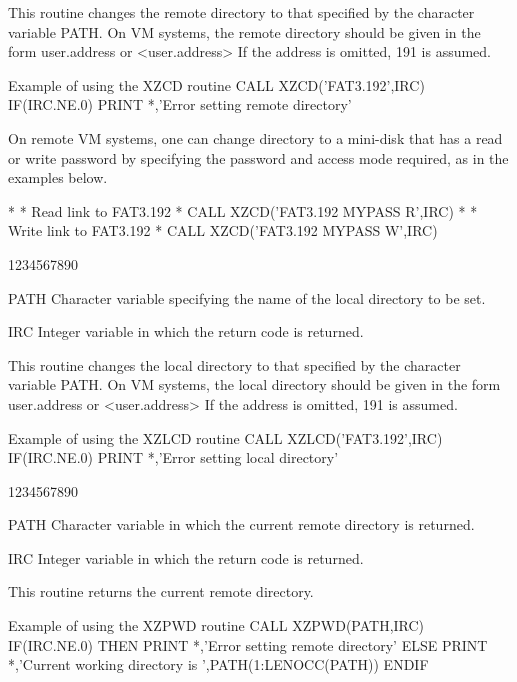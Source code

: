 \par
This routine changes the remote directory to that specified by
the character variable PATH. On VM systems, the remote directory
should be given in the form user.address or <user.address>
If the address is omitted, 191 is assumed.
\begin{XMPt}{Example of using the XZCD routine}
      CALL XZCD('FAT3.192',IRC)
      IF(IRC.NE.0) PRINT *,'Error setting remote directory'
\end{XMPt}
On remote VM systems, one can change directory to a mini-disk that
has a read or write password by specifying the password and access
mode required, as in the examples below.
\begin{XMP}
*
*     Read link to FAT3.192
*
      CALL XZCD('FAT3.192 MYPASS R',IRC)
*
*     Write link to FAT3.192
*
      CALL XZCD('FAT3.192 MYPASS W',IRC)
\end{XMP}
\begin{DLtt}{1234567890}
\item[PATH]Character variable specifying the name of the local directory
to be set.
\item[IRC]Integer variable in which the return code is returned.
\end{DLtt}
\par
This routine changes the local directory to that specified by
the character variable PATH. On VM systems, the local directory
should be given in the form user.address or <user.address>
If the address is omitted, 191 is assumed.
\begin{XMPt}{Example of using the XZLCD routine}
      CALL XZLCD('FAT3.192',IRC)
      IF(IRC.NE.0) PRINT *,'Error setting local directory'
\end{XMPt}
\begin{DLtt}{1234567890}
\item[PATH]Character variable in which the current remote directory
is returned.
\item[IRC]Integer variable in which the return code is returned.
\end{DLtt}
\par
This routine returns the current remote directory.
\begin{XMPt}{Example of using the XZPWD routine}
      CALL XZPWD(PATH,IRC)
      IF(IRC.NE.0) THEN
         PRINT *,'Error setting remote directory'
      ELSE
         PRINT *,'Current working directory is ',PATH(1:LENOCC(PATH))
      ENDIF
\end{XMPt}
